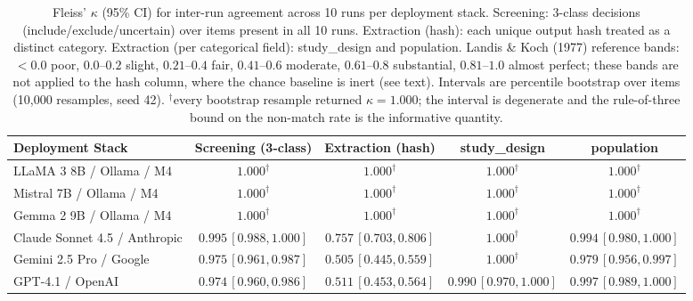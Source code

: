 \documentclass[11pt]{article}
\newenvironment{fittab}{\begin{lrbox}{\fittabbox}}{\end{lrbox}%
  \ifdim\wd\fittabbox>\linewidth\resizebox{\linewidth}{!}{\usebox{\fittabbox}}\else\usebox{\fittabbox}\fi}
\begin{document}
\begin{table}[htbp]
\centering
\caption{Fleiss' $\kappa$ (95\% CI) for inter-run agreement across 10 runs per deployment stack. Screening: 3-class decisions (include/exclude/uncertain) over items present in all 10 runs. Extraction (hash): each unique output hash treated as a distinct category. Extraction (per categorical field): study\_design and population. Landis \& Koch (1977) reference bands: $<0.0$ poor, $0.0$--$0.2$ slight, $0.21$--$0.4$ fair, $0.41$--$0.6$ moderate, $0.61$--$0.8$ substantial, $0.81$--$1.0$ almost perfect; these bands are not applied to the hash column, where the chance baseline is inert (see text). Intervals are percentile bootstrap over items (10,000 resamples, seed 42). $^{\dagger}$every bootstrap resample returned $\kappa{=}1.000$; the interval is degenerate and the rule-of-three bound on the non-match rate is the informative quantity.}
\label{tab:fleiss}
\begin{fittab}\begin{tabular}{lcccc}
\toprule
\textbf{Deployment Stack} & \textbf{Screening (3-class)} & \textbf{Extraction (hash)} & \textbf{study\_design} & \textbf{population} \\
\midrule
LLaMA 3 8B / Ollama / M4       & $1.000^{\dagger}$ & $1.000^{\dagger}$ & $1.000^{\dagger}$ & $1.000^{\dagger}$ \\
Mistral 7B / Ollama / M4       & $1.000^{\dagger}$ & $1.000^{\dagger}$ & $1.000^{\dagger}$ & $1.000^{\dagger}$ \\
Gemma 2 9B / Ollama / M4       & $1.000^{\dagger}$ & $1.000^{\dagger}$ & $1.000^{\dagger}$ & $1.000^{\dagger}$ \\
\midrule
Claude Sonnet 4.5 / Anthropic  & $0.995\,[0.988, 1.000]$ & $\mathbf{0.757\,[0.703, 0.806]}$ & $1.000^{\dagger}$ & $0.994\,[0.980, 1.000]$ \\
Gemini 2.5 Pro / Google        & $0.975\,[0.961, 0.987]$ & $\mathbf{0.505\,[0.445, 0.559]}$ & $1.000^{\dagger}$ & $0.979\,[0.956, 0.997]$ \\
GPT-4.1 / OpenAI               & $0.974\,[0.960, 0.986]$ & $\mathbf{0.511\,[0.453, 0.564]}$ & $0.990\,[0.970, 1.000]$ & $0.997\,[0.989, 1.000]$ \\
\bottomrule
\end{tabular}\end{fittab}
\end{table}
\end{document}
